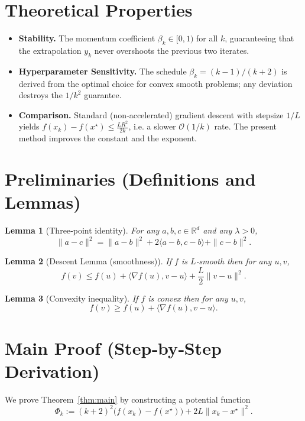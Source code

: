 \documentclass{article}
\newtheorem{lemma}{Lemma}
\newcommand{\grad}{\nabla}
\begin{document}
\section*{Theoretical Properties}
\begin{itemize}
\item \textbf{Stability.} The momentum coefficient $\beta_k\in[0,1)$ for all $k$, guaranteeing that the extrapolation $y_k$ never overshoots the previous two iterates.
\item \textbf{Hyperparameter Sensitivity.} The schedule $\beta_k=(k-1)/(k+2)$ is derived from the optimal choice for convex smooth problems; any deviation destroys the $1/k^{2}$ guarantee.
\item \textbf{Comparison.} Standard (non‑accelerated) gradient descent with stepsize $1/L$ yields $f(x_k)-f(x^{\star})\le \frac{L R^{2}}{2k}$, i.e. a slower $\mathcal{O}(1/k)$ rate. The present method improves the constant and the exponent.
\end{itemize}

\section*{Preliminaries (Definitions and Lemmas)}
\begin{lemma}[Three‑point identity]\label{lem:three}
For any $a,b,c\in\mathbb{R}^d$ and any $\lambda>0$,
\[
\|a-c\|^{2}= \|a-b\|^{2}+2\langle a-b,c-b\rangle+\|c-b\|^{2}.
\tag{L1}
\]
\end{lemma}

\begin{lemma}[Descent Lemma (smoothness)]\label{lem:descent}
If $f$ is $L$‑smooth then for any $u,v$,
\[
f(v)\le f(u)+\langle\grad f(u),v-u\rangle+\frac{L}{2}\|v-u\|^{2}.
\tag{L2}
\]
\end{lemma}

\begin{lemma}[Convexity inequality]\label{lem:conv}
If $f$ is convex then for any $u,v$,
\[
f(v)\ge f(u)+\langle\grad f(u),v-u\rangle.
\tag{L3}
\]
\end{lemma}

\section*{Main Proof (Step‑by‑Step Derivation)}
We prove Theorem~\ref{thm:main} by constructing a potential function
\[
\Phi_k:= (k+2)^{2}\bigl(f(x_k)-f(x^{\star})\bigr)+2L\|x_k-x^{\star}\|^{2}.
\tag{P1}
\]
\end{document}

